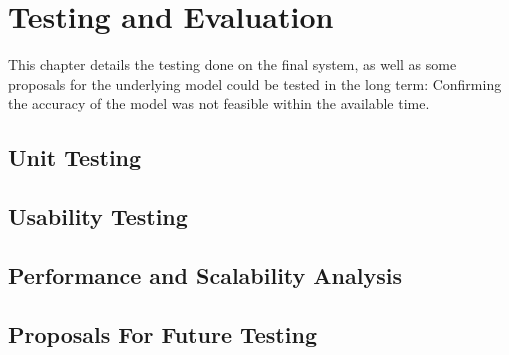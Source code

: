 \chapter{Testing and Evaluation}
  This chapter details the testing done on the final system, as well as some proposals for the underlying model could be tested in the long term: Confirming the accuracy of the model was not feasible within the available time.

  \section{Unit Testing}
  \section{Usability Testing}
  \section{Performance and Scalability Analysis}
  \section{Proposals For Future Testing}
